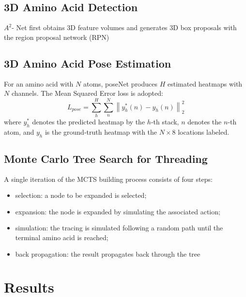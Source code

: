 \documentclass[final, xcolor=cmyk]{beamer}
\begin{document}
\begin{poster}
\vspace*{1ex}
\subsection{3D Amino Acid Detection} \justifying
$A^2$- Net first obtains 3D feature volumes and generates 3D box proposals with the region proposal network (RPN)

\vspace*{1ex}
\subsection{3D Amino Acid Pose Estimation} \justifying
For an amino acid with $N$ atoms, poseNet produces $H$ estimated heatmaps with $N$ channels. The Mean Squared Error loss is adopted:
\begin{equation}
    L_{p o s e}=\sum_{h}^{H} \sum_{n}^{N}\left\|y_{h}^{*}(n)-y_{h}(n)\right\|_{2}^{2}
    \end{equation}
    where $y_{h}^{*}$ denotes the predicted heatmap by the $h$-th stack,
$n$ denotes the $n$-th atom, and $y_h$ is the ground-truth heatmap with the $N \times 8$ locations labeled.

\vspace*{1ex}
\subsection{Monte Carlo Tree Search for Threading} \justifying
A single iteration of the MCTS building process consists of four steps: 
\begin{itemize}
    \item selection: a node to be expanded is selected;
    \item expansion: the node is expanded by simulating the associated action;
    \item simulation: the tracing is simulated following a random path until the terminal amino acid is reached;
    \item back propagation: the result propagates back through the tree
\end{itemize}

\newcolumn

  
\section{Results} 

\end{poster}
\end{document}

